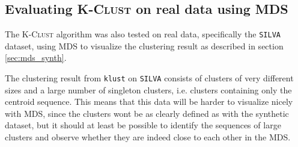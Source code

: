 

\subsection{Evaluating \textsc{K-Clust} on real data using MDS}
\label{sec:mds_real_data}

The \textsc{K-Clust} algorithm was also tested on real data, specifically the
\texttt{SILVA} dataset, using MDS to visualize the clustering result as
described in section \ref{sec:mds_synth}.

The clustering result from \texttt{klust} on \texttt{SILVA} consists of
clusters of very different sizes and a large number of singleton clusters, i.e.
clusters containing only the centroid sequence. This means that this data will
be harder to visualize nicely with MDS, since the clusters wont be as clearly
defined as with the synthetic dataset, but it should at least be possible to
identify the sequences of large clusters and observe whether they are indeed
close to each other in the MDS.

